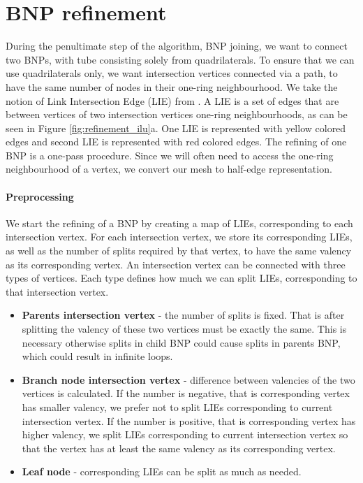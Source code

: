 \section{BNP refinement}\label{sec:bnp_sub}
During the penultimate step of the algorithm, BNP joining, we want to connect two BNPs, with tube consisting solely from quadrilaterals. To ensure that we can use quadrilaterals only, we want intersection vertices connected via a path, to have the same number of nodes in their one-ring neighbourhood. We take the notion of Link Intersection Edge (LIE) from \cite{sqm}. A LIE is a set of edges that are between vertices of two intersection vertices one-ring neighbourhoods, as can be seen in Figure \ref{fig:refinement_ilu}a. One LIE is represented with yellow colored edges and second LIE is represented with red colored edges. The refining of one BNP is a one-pass procedure. Since we will often need to access the one-ring neighbourhood of a vertex, we convert our mesh to half-edge representation.

\paragraph{Preprocessing}
We start the refining of a BNP by creating a map of LIEs, corresponding to each intersection vertex. For each intersection vertex, we store its corresponding LIEs, as well as the number of splits required by that vertex, to have the same valency as its corresponding vertex. An intersection vertex can be connected with three types of vertices. Each type defines how much we can split LIEs, corresponding to that intersection vertex.
\begin{itemize}
	\itemsep-0.25em 
	\item \textbf{Parents intersection vertex} - the number of splits is fixed. That is after splitting the valency of these two vertices must be exactly the same. This is necessary otherwise splits in child BNP could cause splits in parents BNP, which could result in infinite loops.
	\item \textbf{Branch node intersection vertex} - difference between valencies of the two vertices is calculated. If the number is negative, that is corresponding vertex has smaller valency, we prefer not to split LIEs corresponding to current intersection vertex. If the number is positive, that is corresponding vertex has higher valency, we split LIEs corresponding to current intersection vertex so that the vertex has at least the same valency as its corresponding vertex.
	\item \textbf{Leaf node} - corresponding LIEs can be split as much as needed.
\end{itemize}

